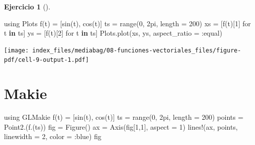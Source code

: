 \documentclass[
  a4paper,
]{scrreport}
\newenvironment{Shaded}{\begin{snugshade}}{\end{snugshade}}
\newcommand{\BuiltInTok}[1]{\textcolor[rgb]{0.00,0.23,0.31}{#1}}
\newcommand{\FloatTok}[1]{\textcolor[rgb]{0.68,0.00,0.00}{#1}}
\newcommand{\FunctionTok}[1]{\textcolor[rgb]{0.28,0.35,0.67}{#1}}
\newcommand{\ImportTok}[1]{\textcolor[rgb]{0.00,0.46,0.62}{#1}}
\newcommand{\KeywordTok}[1]{\textcolor[rgb]{0.00,0.23,0.31}{\textbf{#1}}}
\newcommand{\NormalTok}[1]{\textcolor[rgb]{0.00,0.23,0.31}{#1}}
\newcommand{\OperatorTok}[1]{\textcolor[rgb]{0.37,0.37,0.37}{#1}}
\theoremstyle{definition}
\newtheorem{exercise}{Ejercicio}[chapter]
\theoremstyle{remark}
\begin{document}
\begin{exercise}[]
\begin{enumerate}
\begin{tcolorbox}
\begin{Shaded}
\begin{Highlighting}[]
\ImportTok{using} \BuiltInTok{Plots}
\FunctionTok{f}\NormalTok{(t) }\OperatorTok{=}\NormalTok{ [}\FunctionTok{sin}\NormalTok{(t), }\FunctionTok{cos}\NormalTok{(t)] }
\NormalTok{ts }\OperatorTok{=} \FunctionTok{range}\NormalTok{(}\FloatTok{0}\NormalTok{, }\FloatTok{2}\NormalTok{pi, length }\OperatorTok{=} \FloatTok{200}\NormalTok{)}
\NormalTok{xs }\OperatorTok{=}\NormalTok{ [}\FunctionTok{f}\NormalTok{(t)[}\FloatTok{1}\NormalTok{] for t }\KeywordTok{in}\NormalTok{ ts]}
\NormalTok{ys }\OperatorTok{=}\NormalTok{ [}\FunctionTok{f}\NormalTok{(t)[}\FloatTok{2}\NormalTok{] for t }\KeywordTok{in}\NormalTok{ ts]}
\NormalTok{Plots.}\FunctionTok{plot}\NormalTok{(xs, ys, aspect\_ratio }\OperatorTok{=} \OperatorTok{:}\NormalTok{equal)}
\end{Highlighting}
\end{Shaded}

  \texttt{[image: index\_files/mediabag/08-funciones-vectoriales\_files/figure-pdf/cell-9-output-1.pdf]}

  \section{Makie}

\begin{Shaded}
\begin{Highlighting}[]
\ImportTok{using} \BuiltInTok{GLMakie}
\FunctionTok{f}\NormalTok{(t) }\OperatorTok{=}\NormalTok{ [}\FunctionTok{sin}\NormalTok{(t), }\FunctionTok{cos}\NormalTok{(t)] }
\NormalTok{ts }\OperatorTok{=} \FunctionTok{range}\NormalTok{(}\FloatTok{0}\NormalTok{, }\FloatTok{2}\NormalTok{pi, length }\OperatorTok{=} \FloatTok{200}\NormalTok{)}
\NormalTok{points }\OperatorTok{=} \FunctionTok{Point2}\NormalTok{.(}\FunctionTok{f}\NormalTok{.(ts))}
\NormalTok{fig }\OperatorTok{=} \FunctionTok{Figure}\NormalTok{()}
\NormalTok{ax }\OperatorTok{=} \FunctionTok{Axis}\NormalTok{(fig[}\FloatTok{1}\NormalTok{,}\FloatTok{1}\NormalTok{], aspect }\OperatorTok{=} \FloatTok{1}\NormalTok{)}
\FunctionTok{lines!}\NormalTok{(ax, points, linewidth }\OperatorTok{=} \FloatTok{2}\NormalTok{, color }\OperatorTok{=} \OperatorTok{:}\NormalTok{blue)}
\NormalTok{fig}
\end{Highlighting}
\end{Shaded}


\end{tcolorbox}
\end{enumerate}
\end{exercise}
\end{document}

